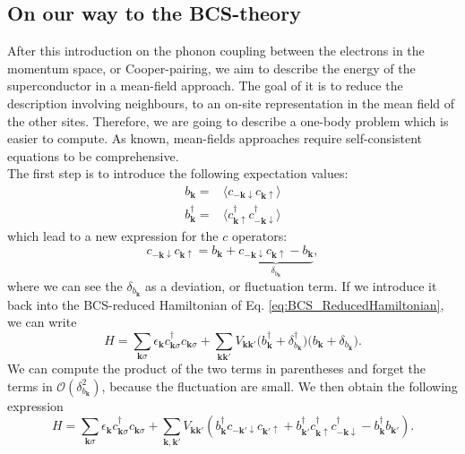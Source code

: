\documentclass[../main.tex]{subfile}
\begin{document}
\subsection{On our way to the BCS-theory}
After this introduction on the phonon coupling between the electrons in the momentum space, or Cooper-pairing,
we aim to describe the energy of the superconductor in a mean-field approach. The goal of it is to reduce the description
involving neighbours, to an on-site representation in the mean field of the other sites. Therefore, we are going to describe 
a one-body problem which is easier to compute. As known, mean-fields approaches require self-consistent equations to be comprehensive.\\

The first step is to introduce the following expectation values:
\begin{align}
    b_{\bm{k}} = &\langle c_{-\bm{k}\downarrow}c_{\bm{k}\uparrow}\rangle \label{eq:ExpectBCS} \\
    b_{\bm{k}}^{\dagger} = &\langle c_{\bm{k}\uparrow}^{\dagger}c_{-\bm{k}\downarrow}^{\dagger}\rangle  \label{eq:ExpectBCSDag}
\end{align}
which lead to a new expression for the $c$ operators:
\begin{equation}
    c_{-\bm{k}\downarrow}c_{\bm{k}\uparrow} = b_{\bm{k}} + \underbrace{c_{-\bm{k}\downarrow}c_{\bm{k}\uparrow} - b_{\bm{k}}}_{\delta_{b_{\bm{k}}}},
\end{equation}
where we can see the $\delta_{b_{\bm{k}}}$ as a deviation, or fluctuation term. If we introduce it back into the BCS-reduced Hamiltonian of Eq. \ref{eq:BCS_ReducedHamiltonian},
we can write
\[
    H = \sum_{\bm{k}\sigma} \epsilon_{\bm{k}} c_{\bm{k}\sigma}^{\dagger}c_{\bm{k}\sigma} + \sum_{\bm{k}\bm{k}'} V_{\bm{k}\bm{k}'} \bigl( b_{\bm{k}}^{\dagger} + \delta_{b_{\bm{k}}}^{\dagger}\bigr)\bigl( b_{\bm{k}} + \delta_{b_{\bm{k}}}\bigr).
\]
We can compute the product of the two terms in parentheses and forget the terms in $\mathcal{O}\left(\delta_{b_{\bm{k}}}^2\right)$, because the fluctuation are small.
We then obtain the following expression
\[
    H = \sum_{\bm{k}\sigma} \epsilon_{\bm{k}} c_{\bm{k}\sigma}^{\dagger}c_{\bm{k}\sigma} + \sum_{\bm{k},\bm{k}'} V_{\bm{k}\bm{k}'} \left( b_{\bm{k}}^{\dagger}c_{-\bm{k}'\downarrow}c_{\bm{k}'\uparrow}  + b_{\bm{k}'}^{\dagger} c_{\bm{k}\uparrow} ^{\dagger}c_{-\bm{k}\downarrow}^{\dagger} -  b_{\bm{k}}^{\dagger} b_{\bm{k}'}\right).
\]
\end{document}
